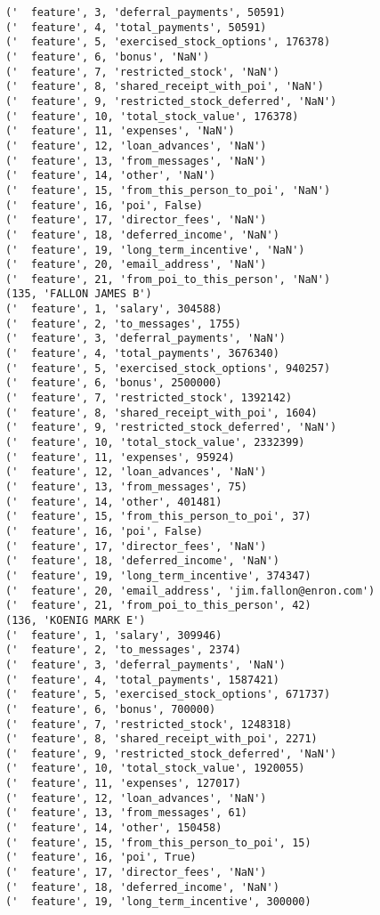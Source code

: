 \begin{verbatim}
('  feature', 3, 'deferral_payments', 50591)
('  feature', 4, 'total_payments', 50591)
('  feature', 5, 'exercised_stock_options', 176378)
('  feature', 6, 'bonus', 'NaN')
('  feature', 7, 'restricted_stock', 'NaN')
('  feature', 8, 'shared_receipt_with_poi', 'NaN')
('  feature', 9, 'restricted_stock_deferred', 'NaN')
('  feature', 10, 'total_stock_value', 176378)
('  feature', 11, 'expenses', 'NaN')
('  feature', 12, 'loan_advances', 'NaN')
('  feature', 13, 'from_messages', 'NaN')
('  feature', 14, 'other', 'NaN')
('  feature', 15, 'from_this_person_to_poi', 'NaN')
('  feature', 16, 'poi', False)
('  feature', 17, 'director_fees', 'NaN')
('  feature', 18, 'deferred_income', 'NaN')
('  feature', 19, 'long_term_incentive', 'NaN')
('  feature', 20, 'email_address', 'NaN')
('  feature', 21, 'from_poi_to_this_person', 'NaN')
(135, 'FALLON JAMES B')
('  feature', 1, 'salary', 304588)
('  feature', 2, 'to_messages', 1755)
('  feature', 3, 'deferral_payments', 'NaN')
('  feature', 4, 'total_payments', 3676340)
('  feature', 5, 'exercised_stock_options', 940257)
('  feature', 6, 'bonus', 2500000)
('  feature', 7, 'restricted_stock', 1392142)
('  feature', 8, 'shared_receipt_with_poi', 1604)
('  feature', 9, 'restricted_stock_deferred', 'NaN')
('  feature', 10, 'total_stock_value', 2332399)
('  feature', 11, 'expenses', 95924)
('  feature', 12, 'loan_advances', 'NaN')
('  feature', 13, 'from_messages', 75)
('  feature', 14, 'other', 401481)
('  feature', 15, 'from_this_person_to_poi', 37)
('  feature', 16, 'poi', False)
('  feature', 17, 'director_fees', 'NaN')
('  feature', 18, 'deferred_income', 'NaN')
('  feature', 19, 'long_term_incentive', 374347)
('  feature', 20, 'email_address', 'jim.fallon@enron.com')
('  feature', 21, 'from_poi_to_this_person', 42)
(136, 'KOENIG MARK E')
('  feature', 1, 'salary', 309946)
('  feature', 2, 'to_messages', 2374)
('  feature', 3, 'deferral_payments', 'NaN')
('  feature', 4, 'total_payments', 1587421)
('  feature', 5, 'exercised_stock_options', 671737)
('  feature', 6, 'bonus', 700000)
('  feature', 7, 'restricted_stock', 1248318)
('  feature', 8, 'shared_receipt_with_poi', 2271)
('  feature', 9, 'restricted_stock_deferred', 'NaN')
('  feature', 10, 'total_stock_value', 1920055)
('  feature', 11, 'expenses', 127017)
('  feature', 12, 'loan_advances', 'NaN')
('  feature', 13, 'from_messages', 61)
('  feature', 14, 'other', 150458)
('  feature', 15, 'from_this_person_to_poi', 15)
('  feature', 16, 'poi', True)
('  feature', 17, 'director_fees', 'NaN')
('  feature', 18, 'deferred_income', 'NaN')
('  feature', 19, 'long_term_incentive', 300000)

\end{verbatim}
